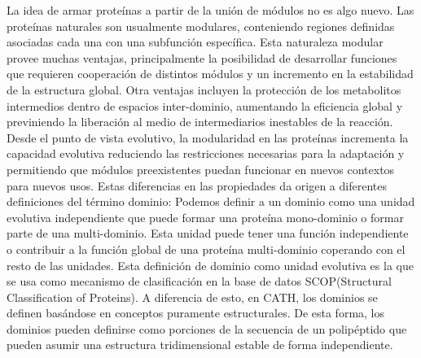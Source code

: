 La idea de armar proteínas a partir de la unión de módulos no es algo nuevo.
Las proteínas naturales son usualmente modulares, conteniendo regiones definidas asociadas cada una con una subfunción específica.
Esta naturaleza modular provee muchas ventajas, principalmente la posibilidad de desarrollar funciones que requieren cooperación de distintos módulos y un incremento en la estabilidad de la estructura global.
Otra ventajas incluyen la protección de los metabolitos intermedios dentro de espacios inter-dominio, aumentando la eficiencia global y previniendo la liberación al medio de intermediarios inestables de la reacción.  
Desde el punto de vista evolutivo, la modularidad en las proteínas incrementa la capacidad evolutiva reduciendo las restricciones necesarias 
para la adaptación y permitiendo que módulos preexistentes puedan funcionar en nuevos contextos para nuevos usos.
Estas diferencias en las propiedades da origen a diferentes definiciones del término dominio: 
Podemos definir a un dominio como una unidad evolutiva independiente que puede formar una proteína mono-dominio o formar parte de una multi-dominio. 
Esta unidad puede tener una función independiente o contribuir a la función global de una proteína multi-dominio coperando con el resto de las unidades.
Esta definición de dominio como unidad evolutiva es la que se usa como mecanismo de clasificación en la base de datos SCOP(Structural Classification of Proteins)\cite{murzin1995scop}. 
A diferencia de esto, en CATH\cite{orengo1997cath}, los dominios se definen basándose en conceptos puramente estructurales. 
De esta forma, los dominios pueden definirse como porciones de la secuencia de un polipéptido que pueden asumir una estructura tridimensional estable de forma independiente. 

